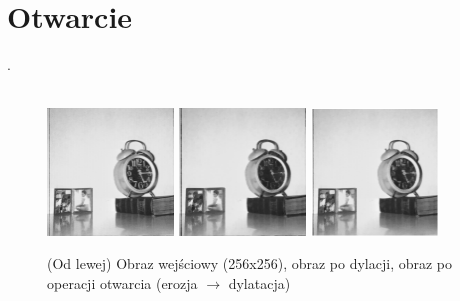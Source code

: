 \documentclass[final,a4paper,openany,12pt]{mwbk}
\begin{document}
\section{ Otwarcie}
.
\hfill
\\\\
\indent

\begin{figure}[H]
	\begin{center}
		\includegraphics[width=0.3\textwidth]{1/1Gray_Op_Original}
		\includegraphics[width=0.3\textwidth]{1/1Gray_Op_E_Result}
		\includegraphics[width=0.3\textwidth]{1/1Gray_Op_ED_Result}
	\end{center}
	\caption{(Od lewej) Obraz wejściowy (256x256), obraz po dylacji, obraz po operacji otwarcia (erozja $\rightarrow$ dylatacja)}
\end{figure}
\end{document}
